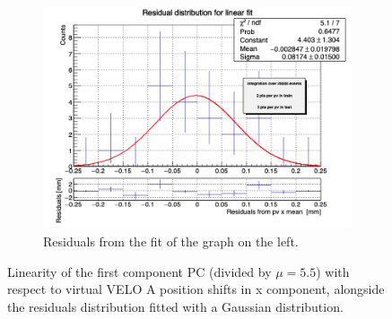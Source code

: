 $$\begin{figure}
\begin{subfigure}{0.48\textwidth}
    \includegraphics[width=\linewidth]{figures/x_res_veloA_MC.png}
    \caption{Residuals from the fit of the graph on the left. }\label{fig:x_veloA_res_MC}
    \end{subfigure}
    \caption{Linearity of the first component PC (divided by $\mu=5.5$) with respect to virtual VELO A position shifts in x component, alongside the residuals distribution fitted with a Gaussian distribution.}
    \label{fig:x_veloA_MC}
\end{figure}


